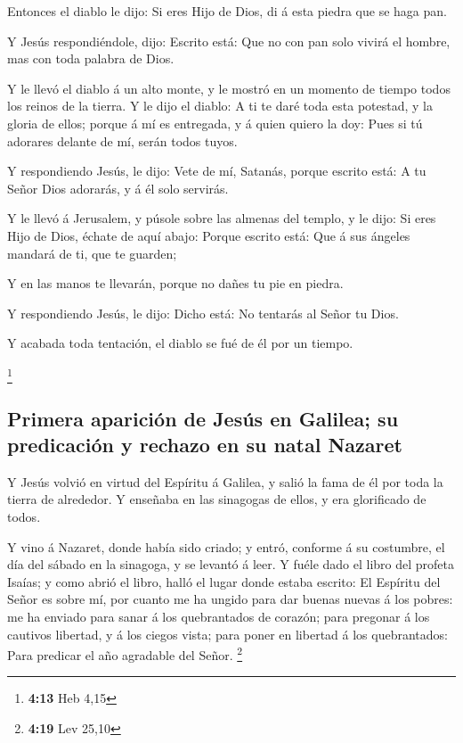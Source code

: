  Entonces el diablo le dijo: Si eres Hijo de Dios, di á esta
piedra que se haga pan.

 Y Jesús respondiéndole, dijo: Escrito está: Que no con pan
solo vivirá el hombre, mas con toda palabra de Dios.

 Y le llevó el diablo á un alto monte, y le mostró en un
momento de tiempo todos los reinos de la tierra.  Y le dijo
el diablo: A ti te daré toda esta potestad, y la gloria de ellos; porque
á mí es entregada, y á quien quiero la doy:  Pues si tú
adorares delante de mí, serán todos tuyos.

 Y respondiendo Jesús, le dijo: Vete de mí, Satanás, porque
escrito está: A tu Señor Dios adorarás, y á él solo servirás.

 Y le llevó á Jerusalem, y púsole sobre las almenas del
templo, y le dijo: Si eres Hijo de Dios, échate de aquí abajo:
 Porque escrito está: Que á sus ángeles mandará de ti, que
te guarden;

 Y en las manos te llevarán, porque no dañes tu pie en
piedra.

 Y respondiendo Jesús, le dijo: Dicho está: No tentarás al
Señor tu Dios.

 Y acabada toda tentación, el diablo se fué de él por un
tiempo.

\footnote{\textbf{4:13} Heb 4,15}

\hypertarget{primera-apariciuxf3n-de-jesuxfas-en-galilea-su-predicaciuxf3n-y-rechazo-en-su-natal-nazaret}{%
\subsection{Primera aparición de Jesús en Galilea; su predicación y
rechazo en su natal
Nazaret}\label{primera-apariciuxf3n-de-jesuxfas-en-galilea-su-predicaciuxf3n-y-rechazo-en-su-natal-nazaret}}

 Y Jesús volvió en virtud del Espíritu á Galilea, y salió
la fama de él por toda la tierra de alrededor.  Y enseñaba
en las sinagogas de ellos, y era glorificado de todos.

 Y vino á Nazaret, donde había sido criado; y entró,
conforme á su costumbre, el día del sábado en la sinagoga, y se levantó
á leer.  Y fuéle dado el libro del profeta Isaías; y como
abrió el libro, halló el lugar donde estaba escrito:  El
Espíritu del Señor es sobre mí, por cuanto me ha ungido para dar buenas
nuevas á los pobres: me ha enviado para sanar á los quebrantados de
corazón; para pregonar á los cautivos libertad, y á los ciegos vista;
para poner en libertad á los quebrantados:  Para predicar
el año agradable del Señor. \footnote{\textbf{4:19} Lev 25,10}

